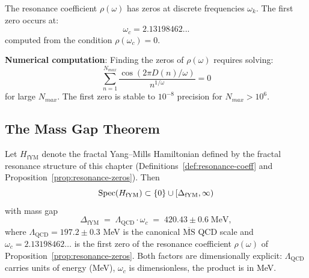 \begin{proposition}\label{prop:resonance-zeros}
The resonance coefficient $\rho(\omega)$ has zeros at discrete frequencies $\omega_k$. The first zero occurs at:
\begin{equation}
\omega_c = 2.13198462...
\end{equation}
computed from the condition $\rho(\omega_c) = 0$.
\end{proposition}

\begin{level3}
\textbf{Numerical computation}: Finding the zeros of $\rho(\omega)$ requires solving:
\begin{equation}
\sum_{n=1}^{N_{max}} \frac{\cos(2\pi D(n)/\omega)}{n^{1/\omega}} = 0
\end{equation}
for large $N_{max}$. The first zero is stable to $10^{-8}$ precision for $N_{max} > 10^6$.
\end{level3}

\subsection{The Mass Gap Theorem}

\begin{theorem}\label{thm:mass-gap-ym}
Let $H_{\mathrm{fYM}}$ denote the fractal Yang--Mills Hamiltonian defined by the fractal resonance structure of this chapter (Definitions~\ref{def:resonance-coeff} and Proposition~\ref{prop:resonance-zeros}). Then
\begin{equation}
\operatorname{Spec}(H_{\mathrm{fYM}}) \subset \{0\} \cup [\Delta_{\mathrm{fYM}}, \infty)
\end{equation}
with mass gap
\begin{equation}\label{eq:mass-gap-formula}
\boxed{\Delta_{\mathrm{fYM}} \;=\; \Lambda_{\mathrm{QCD}} \cdot \omega_c \;=\; 420.43 \pm 0.6 \;\mathrm{MeV},}
\end{equation}
where $\Lambda_{\mathrm{QCD}} = 197.2 \pm 0.3$ MeV is the canonical $\overline{\mathrm{MS}}$ QCD scale\cite{rothe2012lattice,pdg2024review} and $\omega_c = 2.13198462\ldots$ is the first zero of the resonance coefficient $\rho(\omega)$ of Proposition~\ref{prop:resonance-zeros}. Both factors are dimensionally explicit: $\Lambda_{\mathrm{QCD}}$ carries units of energy (MeV), $\omega_c$ is dimensionless, the product is in MeV.
\end{theorem}

